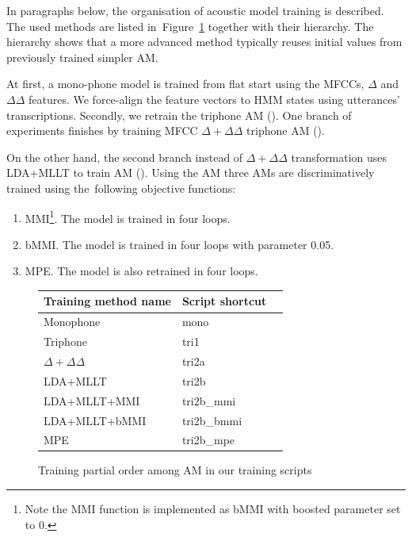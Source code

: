 In paragraphs below, the organisation of acoustic model training is described. 
The used methods are listed in~Figure~\ref{fig:am-deps} together with their hierarchy.
The hierarchy shows that a more advanced method typically reuses initial values from previously trained simpler \ac{AM}.

At first, a mono-phone model is trained from flat start using the MFCCs, $\Delta$ and $\Delta \Delta$ features.
We force-align the feature vectors to HMM states using utterances' transcriptions.
Secondly, we retrain the triphone \ac{AM} ().
One branch of experiments finishes by training \ac{MFCC} $\Delta + \Delta\Delta$ triphone \ac{AM} (). %

On the other hand, the second branch instead of $\Delta + \Delta\Delta$ transformation uses \ac{LDA}+\ac{MLLT} to train \ac{AM} ().
Using the \ac{AM}  three \acp{AM} are discriminatively trained using the~following objective functions:
\begin{enumerate}
    \item \acl{MMI}\cite{chow1990maximum}\footnote{Note the \ac{MMI} function is implemented as \acs{bMMI} with boosted parameter set to 0.}. The model  is trained in four loops.
    \item \acl{bMMI}\cite{povey2008boosted}. The model  is trained in four loops with parameter 0.05.
    \item \acl{MPE}\cite{povey2003mmi}. The model  is also retrained in four loops.
\end{enumerate}

\begin{figure}[!htp]
    \begin{center}
    
    \small{\begin{tabular}{lll}
    \hline
    Training method name & Script shortcut \\
    \hline
    Monophone & mono \\
    Triphone  & tri1 \\
    $\Delta + \Delta\Delta$ & tri2a  \\
    \acs{LDA}+\acs{MLLT} & tri2b  \\
    \acs{LDA}+\acs{MLLT}+\acs{MMI} & tri2b\_mmi \\
    \acs{LDA}+\acs{MLLT}+\acs{bMMI} & tri2b\_bmmi \\
    \acs{MPE} & tri2b\_mpe \\
    \hline
    \end{tabular}}
    \end{center}
    \caption{Training partial order among \ac{AM} in our training scripts}
    \label{fig:am-deps} 
\end{figure}

